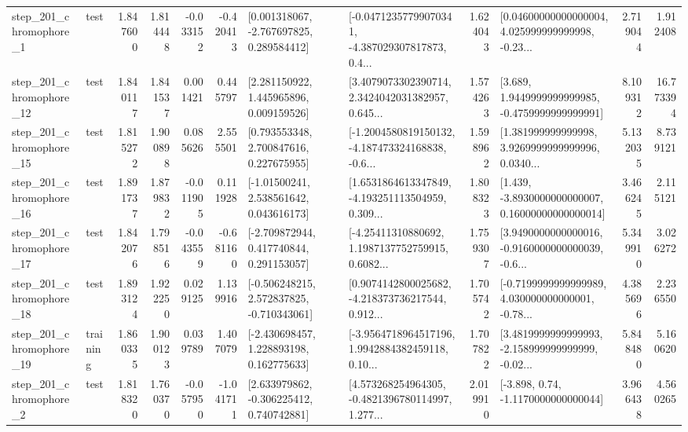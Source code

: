 \begin{tabular}{llrrrrllrlrr}
   step\_201\_chromophore\_1 &      test &      1.847600 &    1.814448 &     -0.033152 & -0.420413 &    [0.001318067, -2.767697825, 0.289584412] &  [-0.04712357799070341, -4.387029307817873, 0.4... &       1.624043 &  [0.04600000000000004, 4.025999999999998, -0.23... &            2.719044 &          1.912408 \\
  step\_201\_chromophore\_12 &      test &      1.840117 &    1.841537 &      0.001421 &  0.445797 &     [2.281150922, 1.445965896, 0.009159526] &  [3.4079073302390714, 2.3424042031382957, 0.645... &       1.574263 &   [3.689, 1.9449999999999985, -0.4759999999999991] &            8.109312 &         16.773394 \\
  step\_201\_chromophore\_15 &      test &      1.815272 &    1.900898 &      0.085626 &  2.555501 &     [0.793553348, 2.700847616, 0.227675955] &  [-1.2004580819150132, -4.187473324168838, -0.6... &       1.598962 &  [1.381999999999998, 3.9269999999999996, 0.0340... &            5.132035 &          8.739121 \\
  step\_201\_chromophore\_16 &      test &      1.891737 &    1.879832 &     -0.011905 &  0.111928 &     [-1.01500241, 2.538561642, 0.043616173] &  [1.6531864613347849, -4.193251113504959, 0.309... &       1.808323 &  [1.439, -3.8930000000000007, 0.16000000000000014] &            3.466245 &          2.115121 \\
  step\_201\_chromophore\_17 &      test &      1.842076 &    1.798516 &     -0.043559 & -0.681160 &    [-2.709872944, 0.417740844, 0.291153057] &  [-4.25411310880692, 1.1987137752759915, 0.6082... &       1.759307 &  [3.9490000000000016, -0.9160000000000039, -0.6... &            5.349910 &          3.026272 \\
  step\_201\_chromophore\_18 &      test &      1.893124 &    1.922250 &      0.029125 &  1.139916 &   [-0.506248215, 2.572837825, -0.710343061] &  [0.9074142800025682, -4.218373736217544, 0.912... &       1.705742 &  [-0.7199999999999989, 4.030000000000001, -0.78... &            4.385696 &          2.236550 \\
  step\_201\_chromophore\_19 &  training &      1.860335 &    1.900123 &      0.039789 &  1.407079 &    [-2.430698457, 1.228893198, 0.162775633] &  [-3.9564718964517196, 1.9942884382459118, 0.10... &       1.707822 &  [3.4819999999999993, -2.158999999999999, -0.02... &            5.848480 &          5.160620 \\
   step\_201\_chromophore\_2 &      test &      1.818320 &    1.760370 &     -0.057950 & -1.041711 &    [2.633979862, -0.306225412, 0.740742881] &  [4.573268254964305, -0.4821396780114997, 1.277... &       2.019910 &                [-3.898, 0.74, -1.1170000000000044] &            3.966438 &          4.560265 \\

\end{tabular}
